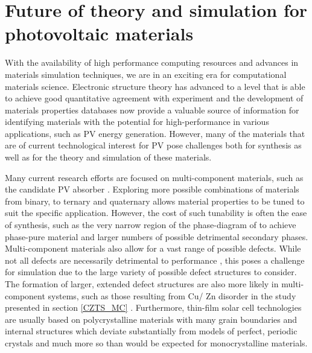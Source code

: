 \documentclass[11pt, twoside]{report}
\begin{document}
\section{Future of theory and simulation for photovoltaic materials}
With the availability of high performance computing resources and advances in materials simulation techniques, we are in an exciting era for computational materials science. Electronic structure theory has advanced to a level that is able to achieve good quantitative agreement with experiment \cite{RichardMartin_Ch1} and the development of materials properties databases now provide a valuable source of information for identifying materials with the potential for high-performance in various applications, such as PV energy generation.
However, many of the materials that are of current technological interest for PV pose challenges both for synthesis as well as for the theory and simulation of these materials.

Many current research efforts are focused on multi-component materials, such as the candidate PV absorber {\CZTS}. Exploring more possible combinations of materials from binary, to ternary and quaternary allows material properties to be tuned to suit the specific application. However, the cost of such tunability is often the ease of synthesis, such as the very narrow region of the phase-diagram of {\CZTS} to achieve phase-pure material \cite{SandS} and larger numbers of possible detrimental secondary phases. Multi-component materials also allow for a vast range of possible defects. While not all defects are necessarily detrimental to performance \cite{Aron_defect_tolerance}, this poses a challenge for simulation due to the large variety of possible defect structures to consider. 
The formation of larger, extended defect structures are also more likely in multi-component systems, such as those resulting from Cu/ Zn disorder in the study presented in section \ref{CZTS_MC} \cite{eris_paper}. Furthermore, thin-film solar cell technologies are usually based on polycrystalline materials with many grain boundaries and internal structures which deviate substantially from models of perfect, periodic crystals and much more so than would be expected for monocrystalline materials. 
\end{document}
